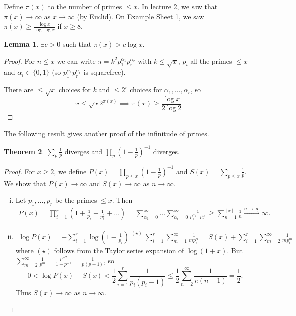 \documentclass{article}
\theoremstyle{definition}
\newtheorem{theorem}{Theorem}[section]
\newtheorem{lemma}[theorem]{Lemma}
\begin{document}


Define $\pi(x)$ to the number of primes $\le x$. In lecture 2, we saw that $\pi(x) \to \infty$ as $x \to \infty$ (by Euclid). On Example Sheet 1, we saw $\pi(x) \ge \frac{\log x}{\log \log x}$ if $x\ge 8$.
\begin{lemma}
    $\exists c>0$ such that $\pi(x)> c \log x$.
\end{lemma}
\begin{proof}
    For $n \le x$ we can write $n = k^2 p_1^{\alpha_1} p_r^{\alpha_r}$ with $k\le \sqrt{x}$, $p_i$ all the primes $\le x$ and $\alpha_i \in \{0,1\}$ (so $p_1^{\alpha_1} p_r^{\alpha_r}$ is squarefree).
    \vspace{1mm}
    
    There are $\le \sqrt{x}$ choices for $k$ and $\le 2^r$ choices for $\alpha_1,\ldots,\alpha_r$, so $$x \le \sqrt{x}2^{\pi(x)} \implies \pi(x) \ge \frac{\log x}{2\log 2}.$$
\end{proof}
The following result gives another proof of the infinitude of primes.
\begin{theorem}\label{5.2}
    $\sum_{p}^{} \frac{1}{p}$ diverges and $\prod_{p}^{} (1-\frac{1}{p})^{-1}$ diverges.
\end{theorem}
\begin{proof}
    For $x\ge 2$, we define $P(x)=\prod_{p\le x}^{} (1-\frac{1}{p})^{-1}$ and $S(x)=\sum_{p\le x}^{} \frac{1}{p}$. We show that $P(x) \to \infty$ and $S(x) \to \infty$ as $n \to \infty$.
    \begin{enumerate}[(i)]
        \item Let $p_1,\ldots,p_r$ be the primes $\le x$. Then 
        \begin{align*}
            P(x) = \prod_{i=1}^{r} (1+\frac{1}{p_i}+\frac{1}{p_i^2}+ \ldots) = \sum_{\alpha_1=0}^{\infty} \ldots \sum_{\alpha_r=0}^{\infty} \frac{1}{p_1^{\alpha_1} \ldots p_r^{\alpha_r}} \ge \sum_{n=1}^{\left\lfloor x \right\rfloor} \frac{1}{n} \stackrel{n \to \infty}{\to} \infty.
        \end{align*}
        \item 
        \begin{align*}
            \log P(x) = -\sum_{i=1}^{r} \log\left(1-\frac{1}{p_i}\right) \stackrel{(\star)}{=}  \sum_{i=1}^{r} \sum_{m=1}^{\infty} \frac{1}{mp_i^m} = S(x) + \sum_{i=1}^{r} \sum_{m=2}^{\infty} \frac{1}{m p_i^m}
        \end{align*}
        where $(\star)$ follows from the Taylor series expansion of $\log(1+x)$. But $\sum_{m=2}^{\infty} \frac{1}{p^m} = \frac{p^{-2}}{1-p^{-1}} = \frac{1}{p(p-1)}$, so \[
        0 < \log P(x) - S(x) < \frac{1}{2}\sum_{i=1}^{r} \frac{1}{p_i(p_i-1)} \le \frac{1}{2}\sum_{n=2}^{\infty} \frac{1}{n(n-1)} = \frac{1}{2}.
        \]
        Thus $S(x) \to \infty$ as $n \to \infty$.
    \end{enumerate}
\end{proof}
\end{document}
